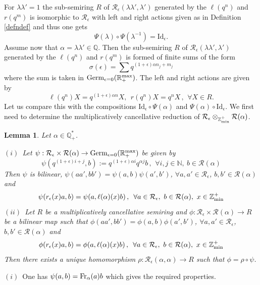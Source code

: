 \documentclass[noams,lp]{compositio}
\newtheorem{lem}[thm]{Lemma}
\def\id{{\rm id}}
\def\N{{\mathbb N}}
\def\Q{{\mathbb Q}}
\def\R{{\mathbb R}}
\def\Z{{\mathbb Z}}
\def\cR{{\mathcal R}}
\def\qqq{\,,\,~\forall}
\def\zminp{\Z_{\rm min}^+}
\def\id{{\mbox{Id}}}
\def\mc{multiplicatively cancellative }
\def\rmax{\R_+^{\rm max}}
\def\fr{{\rm Fr}}
\def\beps{{\cR_\epsilon}}
\def\germ{{{\rm Germ}_{\epsilon=0}(\rmax)}}
\begin{document}
 For $\lambda\lambda'=1$ the sub-semiring $R$ of  $\cR_\epsilon(\lambda\lambda',\lambda')$ generated by the $\ell(q^n)$ and $r(q^m)$ is isomorphic to $\beps$   with left and right actions given as in 
Definition \ref{defndef} and thus one gets 
$$
\Psi(\lambda)\circ \Psi(\lambda^{-1})= \id_\epsilon.
$$
Assume now that $\alpha=\lambda\lambda'\in \Q$. Then the sub-semiring $R$ of  $\cR_\epsilon(\lambda\lambda',\lambda')$ generated by the $\ell(q^n)$ and $r(q^m)$ is formed of finite sums  of the  form 
$$
\sigma(\epsilon)=\sum q^{(1+\epsilon)\alpha n_j+m_j}
$$ 
where the sum is taken in $\germ$. The left and right actions are given by 
\begin{equation}\label{expected}
\ell(q^n)X=q^{(1+\epsilon)\alpha n}X, \  \  r(q^n)X=q^{n}X \qqq X\in R.
\end{equation}
Let us compare this with the compositions $\id_\epsilon\circ \Psi(\alpha)$ and $\Psi(\alpha)\circ \id_\epsilon$. We first need to determine the \mc reduction of  $\beps\otimes_{\zminp} \cR(\alpha)$.

\begin{lem}\label{frobcorres4} Let  $\alpha\in \Q_+^*$.

$(i)$~Let $\psi:\beps\times\cR(\alpha)\to \germ$ be given by 
$$
\psi(q^{(1+\epsilon) i+j},b):=q^{(1+\epsilon)\alpha i}q^{\alpha j}b\qqq i,j\in \N,\ b\in \cR(\alpha)
$$
Then $\psi$ is bilinear, $\psi(aa',bb')=\psi(a,b)\psi(a',b')$, $\forall a,a' \in \beps$, $b,b' \in \cR(\alpha)$ and 
\begin{equation}\label{compa4bis}
\psi(r_\epsilon(x)a,b)=\psi(a,\ell(\alpha)(x)b)\qqq a\in \beps,\ b\in \cR(\alpha), \ x\in \zminp
\end{equation}
$(ii)$~Let $R$ be a \mc semiring and $\phi:\beps\times\cR(\alpha)\to R$ be a bilinear map such that
$\phi(aa',bb')=\phi(a,b)\phi(a',b')$, $\forall a,a' \in \beps$, $b,b' \in \cR(\alpha)$ and 
\begin{equation}\label{hypo4bis}
\phi(r_\epsilon(x)a,b)=\phi(a,\ell(\alpha)(x)b)\qqq a\in \beps,\ b\in \cR(\alpha), \ x\in \zminp
\end{equation}
Then   there exists a unique homomorphism $\rho: \cR_\epsilon(\alpha,\alpha)\to R$ such that $\phi=\rho\circ\psi$.
\end{lem}
\proof $(i)$~One has $\psi(a,b)=\fr_\alpha(a)b$ which gives the required properties. 
\end{document}
